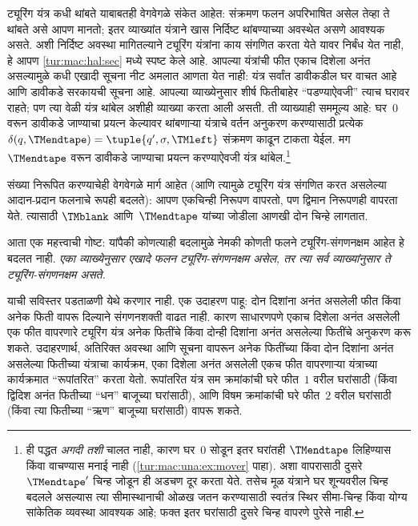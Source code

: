 ट्यूरिंग यंत्र कधी थांबते याबाबतही वेगवेगळे संकेत आहेत:
संक्रमण फलन अपरिभाषित असेल तेव्हा ते थांबते असे आपण मानतो;
इतर व्याख्यांत यंत्राने खास निर्दिष्ट थांबण्याच्या अवस्थेत
असणे आवश्यक असते. अशी निर्दिष्ट अवस्था मागितल्याने ट्यूरिंग
यंत्रांना काय संगणित करता येते यावर निर्बंध येत नाही, हे आपण
\ref{tur:mac:hal:sec} मध्ये स्पष्ट केले आहे. आपल्या यंत्रांची फीत
एकाच दिशेला अनंत असल्यामुळे कधी एखादी सूचना नीट अमलात
आणता येत नाही: यंत्र सर्वांत डावीकडील घर वाचत आहे आणि
डावीकडे सरकायची सूचना आहे. आपल्या व्याख्येनुसार शीर्ष
फितीबाहेर ``पडण्याऐवजी'' त्याच घरावर राहते; पण त्या वेळी
यंत्र थांबेल अशीही व्याख्या करता आली असती. ती व्याख्याही
सममूल्य आहे: घर~$0$ वरून डावीकडे जाण्याचा प्रयत्न केल्यावर
थांबणाऱ्या यंत्राचे वर्तन अनुकरण करण्यासाठी प्रत्येक
$\delta(q,\TMendtape) =
\tuple{q',\sigma,\TMleft}$ संक्रमण काढून टाकता येईल.
मग~$\TMendtape$ वरून डावीकडे जाण्याचा प्रयत्न करण्याऐवजी
यंत्र थांबेल.\footnote{ही पद्धत \emph{अगदी तशी} चालत नाही,
कारण घर~$0$ सोडून इतर घरांतही $\TMendtape$ लिहिण्यास किंवा
वाचण्यास मनाई नाही (\ref{tur:mac:una:ex:mover} पाहा). अशा वापरासाठी
दुसरे~$\TMendtape'$ चिन्ह जोडून ही अडचण दूर करता येते.
तसेच मूळ यंत्राने घर शून्यवरील चिन्ह बदलले असल्यास त्या सीमास्थानाची
ओळख जतन करण्यासाठी स्वतंत्र स्थिर सीमा-चिन्ह किंवा योग्य सांकेतिक
व्यवस्था आवश्यक आहे; फक्त इतर घरांसाठी दुसरे चिन्ह वापरणे पुरेसे नाही.}


संख्या निरूपित करण्याचेही वेगवेगळे मार्ग आहेत (आणि त्यामुळे
ट्यूरिंग यंत्र संगणित करत असलेल्या आदान-प्रदान फलनाचे रूपही
बदलते): आपण एकचिन्ही निरूपण वापरतो, पण द्विमान निरूपणही
वापरता येते. त्यासाठी $\TMblank$ आणि~$\TMendtape$ यांच्या
जोडीला आणखी दोन चिन्हे लागतात.

आता एक महत्त्वाची गोष्ट: यांपैकी कोणत्याही बदलामुळे नेमकी
कोणती फलने ट्यूरिंग-संगणनक्षम आहेत हे बदलत नाही.
\emph{एका व्याख्येनुसार एखादे फलन ट्यूरिंग-संगणनक्षम असेल,
तर त्या सर्व व्याख्यांनुसार ते ट्यूरिंग-संगणनक्षम असते.}

याची सविस्तर पडताळणी येथे करणार नाही. एक उदाहरण पाहू:
दोन दिशांना अनंत असलेली फीत किंवा अनेक फिती वापरू दिल्याने
संगणनशक्ती वाढत नाही. कारण साधारणपणे एकाच दिशेला अनंत असलेली
एक फीत वापरणारे ट्यूरिंग यंत्र अनेक फितींचे किंवा दोन्ही
दिशांना अनंत असलेल्या फितींचे अनुकरण करू शकते. उदाहरणार्थ,
अतिरिक्त अवस्था आणि सूचना वापरून अनेक फितींच्या किंवा
दोन दिशांना अनंत असलेल्या फितीच्या यंत्राचा कार्यक्रम, एका
दिशेला अनंत असलेली एकच फीत वापरणाऱ्या यंत्राच्या कार्यक्रमात
``रूपांतरित'' करता येतो. रूपांतरित यंत्र सम क्रमांकांची घरे
फीत~$1$ वरील घरांसाठी (किंवा द्विदिश अनंत फितीच्या ``धन''
बाजूच्या घरांसाठी), आणि विषम क्रमांकांची घरे फीत~$2$ वरील
घरांसाठी (किंवा त्या फितीच्या ``ऋण'' बाजूच्या घरांसाठी)
वापरू शकते.











